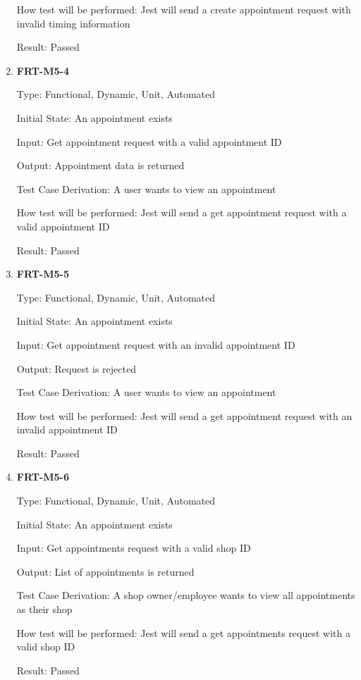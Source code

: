 \documentclass[12pt, titlepage]{article}
\begin{document}
\begin{enumerate}
	      How test will be performed: Jest will send a create appointment request with invalid timing
	      information

	      Result: Passed

	\item \textbf{FRT-M5-4}

	      Type: Functional, Dynamic, Unit, Automated

	      Initial State: An appointment exists

	      Input: Get appointment request with a valid appointment ID

	      Output: Appointment data is returned

	      Test Case Derivation: A user wants to view an appointment

	      How test will be performed: Jest will send a get appointment request with a valid appointment ID

	      Result: Passed

	\item \textbf{FRT-M5-5}

	      Type: Functional, Dynamic, Unit, Automated

	      Initial State: An appointment exists

	      Input: Get appointment request with an invalid appointment ID

	      Output: Request is rejected

	      Test Case Derivation: A user wants to view an appointment

	      How test will be performed: Jest will send a get appointment request with an invalid appointment ID

	      Result: Passed

	\item \textbf{FRT-M5-6}

	      Type: Functional, Dynamic, Unit, Automated

	      Initial State: An appointment exists

	      Input: Get appointments request with a valid shop ID

	      Output: List of appointments is returned

	      Test Case Derivation: A shop owner/employee wants to view all appointments as their shop

	      How test will be performed: Jest will send a get appointments request with a valid shop ID

	      Result: Passed


\end{enumerate}
\end{document}

